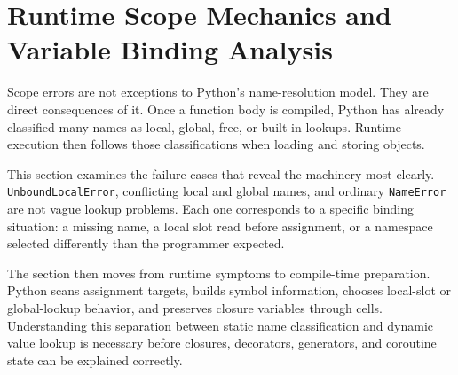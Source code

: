 \section{Runtime Scope Mechanics and Variable Binding Analysis}

Scope errors are not exceptions to Python's name-resolution model. They are direct consequences of it. Once a function body is compiled, Python has already classified many names as local, global, free, or built-in lookups. Runtime execution then follows those classifications when loading and storing objects.

This section examines the failure cases that reveal the machinery most clearly. \texttt{UnboundLocalError}, conflicting local and global names, and ordinary \texttt{NameError} are not vague lookup problems. Each one corresponds to a specific binding situation: a missing name, a local slot read before assignment, or a namespace selected differently than the programmer expected.

The section then moves from runtime symptoms to compile-time preparation. Python scans assignment targets, builds symbol information, chooses local-slot or global-lookup behavior, and preserves closure variables through cells. Understanding this separation between static name classification and dynamic value lookup is necessary before closures, decorators, generators, and coroutine state can be explained correctly.